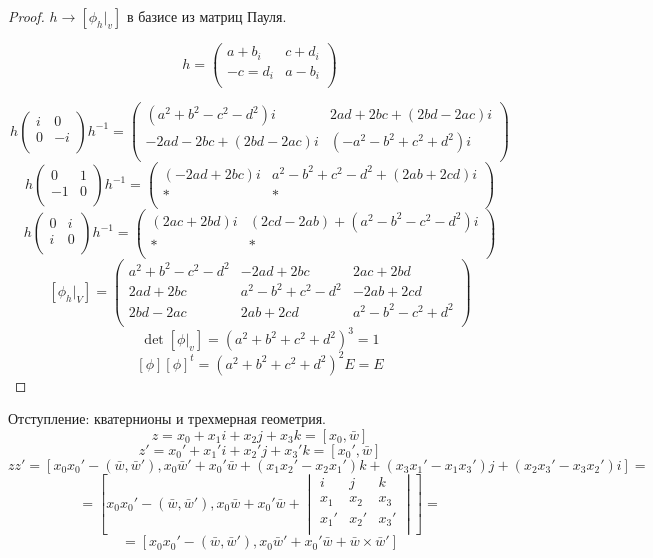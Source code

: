 \begin{proof}
$h \to [\phi_h|_v]$ в базисе из матриц Пауля.

$$
h = \begin{pmatrix}
a + b_i & c + d_i\\
-c = d_i & a - b_i\\
\end{pmatrix}
$$

$$
h \begin{pmatrix}
i & 0\\
0 & -i\\
\end{pmatrix}
h^{-1}
=
\begin{pmatrix}
(a^2 + b^2 - c^2 -d^2)i & 2ad + 2bc + (2bd - 2ac)i\\
-2ad - 2bc + (2bd - 2ac)i & (-a^2 -b^2 + c^2 + d^2)i\\
\end{pmatrix}
$$
$$
h
\begin{pmatrix}
0 & 1\\
-1 & 0\\
\end{pmatrix}
h^{-1} =
\begin{pmatrix}
(-2ad + 2bc)i & a^2 - b^2 + c^2 - d^2 + (2ab + 2cd)i\\
*&*\\
\end{pmatrix}
$$
$$
h
\begin{pmatrix}
0 & i\\
i & 0\\
\end{pmatrix}
h^{-1} =
\begin{pmatrix}
(2ac + 2bd)i & (2cd - 2ab) + (a^2 - b^2 - c^2 - d^2)i\\
*&*\\
\end{pmatrix}
$$
$$
[\phi_h|_V] =
\begin{pmatrix}
a^2 + b^2 - c^2 - d^2 & -2ad + 2bc & 2ac + 2bd\\
2ad + 2bc & a^2 - b^2 + c^2 - d^2 & -2ab + 2cd\\
2bd - 2ac & 2ab + 2cd & a^2 - b^2 - c^2 + d^2\\
\end{pmatrix}
$$
$$\det [\phi|_v] = (a^2 + b^2 + c^2 + d^2)^3 = 1$$
$$[\phi][\phi]^t = (a^2 + b^2 + c^2 + d^2)^2E = E$$
\end{proof}

Отступление: кватернионы и трехмерная геометрия.
$$z = x_0 + x_1i + x_2j + x_3k = [x_0, \bar w]$$
$$z' = x_0' + x_1'i + x_2'j + x_3'k = [x_0', \bar w]$$
$$zz' = [x_0x_0' - (\bar w, \bar w'), x_0\bar w' + x_0'\bar w + (x_1x_2' - x_2 x_1')k + (x_3x_1' - x_1x_3')j + (x_2x_3' - x_3x_2')i]  =$$
$$= [x_0x_0' - (\bar w, \bar w'), x_0\bar w + x_0'\bar w + \begin{vmatrix}
i & j & k\\
x_1 & x_2 & x_3\\
x_1' & x_2' & x_3'\\
\end{vmatrix}] =$$
$$= [x_0x_0' - (\bar w, \bar w'), x_0\bar w' + x_0'\bar w + \bar w \times \bar w'] $$

